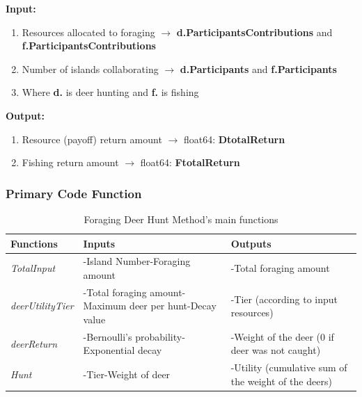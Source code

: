 \textbf{Input:}

\begin{enumerate}
\item \textbf{ }Resources allocated to foraging $\mathrm{\to}$ \textbf{d.ParticipantsContributions }and \textbf{f.ParticipantsContributions}

\item Number of islands collaborating $\mathrm{\to}$ \textbf{d.Participants} and \textbf{f.Participants}

\item Where \textbf{d.} is deer hunting and \textbf{f. }is fishing
\end{enumerate}

\textbf{Output:}

\begin{enumerate}
\item \textbf{ }Resource (payoff) return amount $\mathrm{\to}$ float64: \textbf{DtotalReturn}

\item Fishing return amount $\mathrm{\to}$ float64: \textbf{FtotalReturn}
\end{enumerate}

\subsubsection{Primary Code Function}

\begin{table}[h]
\begin{center}
\begin{tabular}{|p{1.5in}|p{1.5in}|p{1.5in}|} \hline
\textbf{Functions} & \textbf{Inputs} & \textbf{Outputs} \\ \hline
\textit{TotalInput} & -Island Number\newline -Foraging amount & -Total foraging amount \\ \hline
\textit{deerUtilityTier} & -Total foraging amount\newline -Maximum deer per hunt\newline -Decay value & -Tier (according to input resources) \\ \hline
\textit{deerReturn} & -Bernoulli's probability\newline -Exponential decay & -Weight of the deer (0 if deer was not caught) \\ \hline
\textit{Hunt} & -Tier\newline -Weight of deer & -Utility (cumulative sum of the weight of the deers) \\ \hline
\end{tabular}
\caption{\label{tab:table-name}Foraging Deer Hunt Method's main functions}
\end{center}
\end{table}

